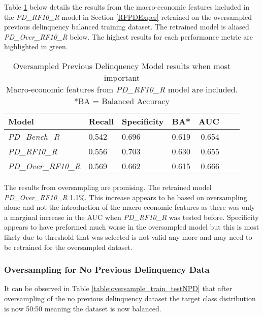 Table \ref{table:overPD} below details the results from the macro-economic features included in the \textit{PD\_RF10\_R} model in Section \ref{RFPDExper} retrained on the oversampled previous delinquency balanced training dataset. The retrained model is aliased \textit{PD\_Over\_RF10\_R} below. The highest results for each performance metric are highlighted in green.

\begin{table}[H]
	\centering
	\small
		\begin{tabular}{l l l r r r r}
			\hline
			\textbf{Model} & \textbf{Recall} & \textbf{Specificity} & \textbf{BA*} & \textbf{AUC}  \\ \hline
			\textit{PD\_Bench\_R} & 0.542 & 0.696 & 0.619 & 0.654 \\ \hline
			\textit{PD\_RF10\_R} & 0.556 & \cellcolor{green!25}0.703 & \cellcolor{green!25}0.630 & 0.655  \\ 
			\textit{PD\_Over\_RF10\_R}  & \cellcolor{green!25}0.569 & 0.662 & 0.615 & \cellcolor{green!25}0.666   \\ \hline
		\end{tabular}
	\caption{{Oversampled Previous Delinquency Model results when most important\\
			Macro-economic features from \textit{PD\_RF10\_R} model are included.
			\\ *BA = Balanced Accuracy}}
	\label{table:overPD}
\end{table}

The results from oversampling are promising. The retrained model \textit{PD\_Over\_RF10\_R} 1.1\%. This increase appears to be based on oversampling alone and not the introduction of the macro-economic features as there was only a marginal increase in the AUC when \textit{PD\_RF10\_R} was tested before. Specificity appears to have preformed much worse in the oversampled model but this is most likely due to threshold that was selected is not valid any more and may need to be retrained for the oversampled dataset. 

\subsubsection{Oversampling for No Previous Delinquency Data}

It can be observed in Table \ref{table:oversample_train_testNPD} that after oversampling of the no previous delinquency dataset the target class distribution is now 50:50 meaning the dataset is now balanced.


